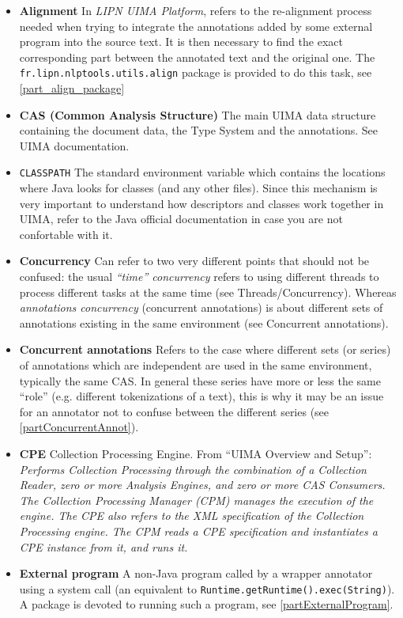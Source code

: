 \documentclass{article}
\newcommand{\softName}{{\em LIPN UIMA Platform}\xspace}
\newenvironment{xitemize}{
\begin{itemize}
  \setlength{\itemsep}{.3\baselineskip}
  \setlength{\topsep}{0pt}
  \setlength{\parskip}{0pt}
  \setlength{\parsep}{0pt}
}{\end{itemize}}
\newcommand{\packname}{fr.lipn.nlptools}
\newcommand{\utilsPackname}{\packname.utils}
\newcommand{\glossEntry}[2]{{\bf #1} #2}
\begin{document}
\begin{xitemize}
\item \glossEntry{Alignment}{In \softName, refers to the re-alignment process needed when trying to integrate the annotations added by some external program into the source text. It is then necessary to find the exact corresponding part between the annotated text and the original one. The {\tt \utilsPackname .align} package is provided to do this task, see \ref{part_align_package}}
\item \glossEntry{CAS (Common Analysis Structure)}{The main UIMA data structure containing the document data, the Type System and the annotations. See UIMA documentation.}
\item{{\tt CLASSPATH} }{ The standard environment variable which contains the locations where Java looks for classes (and any other files). Since this mechanism is very important to understand how descriptors and classes work together in UIMA, refer to the Java official documentation in case you are not confortable with it.}
\item \glossEntry{Concurrency}{Can refer to two very different points that should not be confused: the usual {\em ``time'' concurrency} refers to using different threads to process different tasks at the same time (see Threads/Concurrency). Whereas {\em annotations concurrency} (concurrent annotations) is about different sets of annotations existing in the same environment (see Concurrent annotations).}
\item \glossEntry{Concurrent annotations}{Refers to the case where different sets (or series) of annotations which are independent are used in the same environment, typically the same CAS. In general these series have more or less the same ``role'' (e.g. different tokenizations of a text), this is why it may be an issue for an annotator not to confuse between the different series (see \ref{partConcurrentAnnot}).}
\item \glossEntry{CPE}{Collection Processing Engine. From ``UIMA Overview and Setup'': {\em Performs Collection Processing through the combination of a Collection Reader, zero or more Analysis Engines, and zero or more CAS Consumers. The Collection Processing Manager (CPM) manages the execution of the engine. The CPE also refers to the XML specification of the Collection Processing engine. The CPM reads a CPE specification and instantiates a CPE instance from it, and runs it.} 
}
\item \glossEntry{External program}{A non-Java program called by a wrapper annotator using a system call (an equivalent to {\tt Runtime.getRuntime().exec(String)}). A package is devoted to running such a program, see \ref{partExternalProgram}.}

\end{xitemize}
\end{document}
